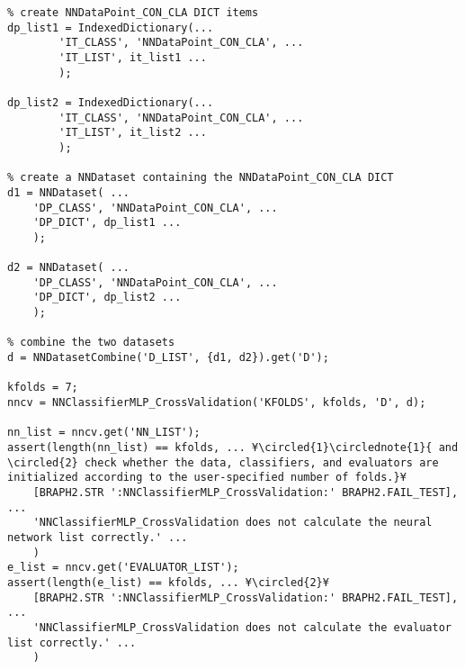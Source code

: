 \documentclass{tufte-handout}
\begin{document}
\begin{lstlisting}
% create NNDataPoint_CON_CLA DICT items
dp_list1 = IndexedDictionary(...
        'IT_CLASS', 'NNDataPoint_CON_CLA', ...
        'IT_LIST', it_list1 ...
        );

dp_list2 = IndexedDictionary(...
        'IT_CLASS', 'NNDataPoint_CON_CLA', ...
        'IT_LIST', it_list2 ...
        );

% create a NNDataset containing the NNDataPoint_CON_CLA DICT
d1 = NNDataset( ...
    'DP_CLASS', 'NNDataPoint_CON_CLA', ...
    'DP_DICT', dp_list1 ...
    );

d2 = NNDataset( ...
    'DP_CLASS', 'NNDataPoint_CON_CLA', ...
    'DP_DICT', dp_list2 ...
    );

% combine the two datasets
d = NNDatasetCombine('D_LIST', {d1, d2}).get('D');

kfolds = 7;
nncv = NNClassifierMLP_CrossValidation('KFOLDS', kfolds, 'D', d);

nn_list = nncv.get('NN_LIST');
assert(length(nn_list) == kfolds, ... ¥\circled{1}\circlednote{1}{ and \circled{2} check whether the data, classifiers, and evaluators are initialized according to the user-specified number of folds.}¥
    [BRAPH2.STR ':NNClassifierMLP_CrossValidation:' BRAPH2.FAIL_TEST], ...
    'NNClassifierMLP_CrossValidation does not calculate the neural network list correctly.' ...
    )
e_list = nncv.get('EVALUATOR_LIST');
assert(length(e_list) == kfolds, ... ¥\circled{2}¥
    [BRAPH2.STR ':NNClassifierMLP_CrossValidation:' BRAPH2.FAIL_TEST], ...
    'NNClassifierMLP_CrossValidation does not calculate the evaluator list correctly.' ...
    )

\end{lstlisting}

%
%
\end{document}
